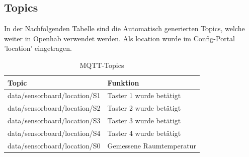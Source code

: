 \subsection{Topics}
In der Nachfolgenden Tabelle sind die Automatisch generierten Topics, welche weiter in Openhab verwendet werden. Als location wurde im Config-Portal 'location' eingetragen.
\begin{table}[H]
	\centering
	\begin{tabular}{|l|l|}
		\hline 
		Topic  & Funktion  \\ 
		\hline 
		data/sensorboard/location/S1 & Taster 1 wurde betätigt  \\ 
		\hline
		data/sensorboard/location/S2 & Taster 2 wurde betätigt  \\ 
		\hline
		data/sensorboard/location/S3 & Taster 3 wurde betätigt  \\ 
		\hline
		data/sensorboard/location/S4 & Taster 4 wurde betätigt  \\ 
		\hline
		data/sensorboard/location/S0 & Gemessene Raumtemperatur  \\ 
		\hline
			\end{tabular} 	
	\label{tab: MQTT-Topics Sensor}
	\caption{MQTT-Topics}
\end{table}

